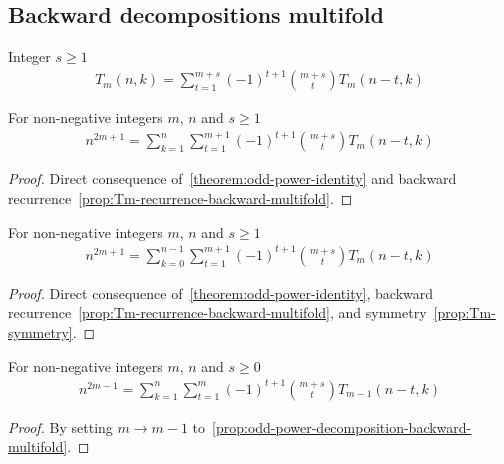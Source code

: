\subsection{Backward decompositions multifold}
\label{subsec:backward-decompositions-multifold}
\begin{proposition}
    \label{prop:Tm-recurrence-backward-multifold}
    Integer $s \geq 1$
    \begin{align*}
        T_{m} (n, k) = \sum_{t=1}^{m+s} (-1)^{t+1} \binom{m+s}{t} T_{m} (n-t, k)
    \end{align*}
\end{proposition}

\begin{proposition}
    \label{prop:odd-power-decomposition-backward-multifold}
    For non-negative integers $m$, $n$ and $s \geq 1$
    \begin{align*}
        n^{2m+1} = \sum_{k=1}^{n} \sum_{t=1}^{m+1} (-1)^{t+1} \binom{m+s}{t} T_{m} (n-t, k)
    \end{align*}
    \begin{proof}
        Direct consequence of~\eqref{theorem:odd-power-identity}
        and backward recurrence~\eqref{prop:Tm-recurrence-backward-multifold}.
    \end{proof}
\end{proposition}

\begin{proposition}
    \label{prop:odd-power-decomposition-backward-shifted-multifold}
    For non-negative integers $m$, $n$ and $s \geq 1$
    \begin{align*}
        n^{2m+1} = \sum_{k=0}^{n-1} \sum_{t=1}^{m+1} (-1)^{t+1} \binom{m+s}{t} T_{m} (n-t, k)
    \end{align*}
    \begin{proof}
        Direct consequence of~\eqref{theorem:odd-power-identity},
        backward recurrence~\eqref{prop:Tm-recurrence-backward-multifold},
        and symmetry~\eqref{prop:Tm-symmetry}.
    \end{proof}
\end{proposition}

\begin{corollary}
    \label{cor:odd-power-decomposition-m-1-multifold}
    For non-negative integers $m$, $n$ and $s \geq 0$
    \begin{align*}
        n^{2m-1} = \sum_{k=1}^{n} \sum_{t=1}^{m} (-1)^{t+1} \binom{m+s}{t} T_{m-1} (n-t, k)
    \end{align*}
    \begin{proof}
        By setting $m \rightarrow m-1$ to~\eqref{prop:odd-power-decomposition-backward-multifold}.
    \end{proof}
\end{corollary}

